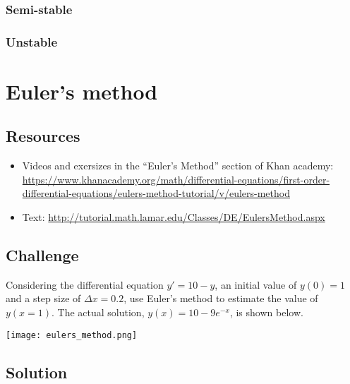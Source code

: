 
\subsubsection*{Semi-stable}
\six{}


\subsubsection*{Unstable}
\six{}


\timebox



\newpage
\section{Euler's method}

\subsection*{Resources}
\begin{itemize}
    \item Videos and exersizes in the ``Euler's Method'' section of Khan academy: \url{https://www.khanacademy.org/math/differential-equations/first-order-differential-equations/eulers-method-tutorial/v/eulers-method}
    \item Text: \url{http://tutorial.math.lamar.edu/Classes/DE/EulersMethod.aspx}
\end{itemize}

\subsection*{Challenge}
Considering the differential equation $y'=10-y$, an initial value of $y(0)=1$ and a step size of $\Delta x = 0.2$, use Euler's method to estimate the value of $y(x=1)$. The actual solution, $y(x)=10-9e^{-x}$, is shown below.

\texttt{[image: eulers\_method.png]}

\subsection*{Solution}
\six{}

\timebox




